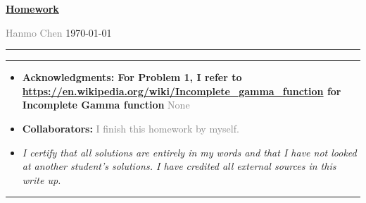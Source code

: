 \documentclass[a4paper]{article}
\begin{document}
\courseheader

\setcounter{hwcnt}{4} %

\begin{center}
  \underline{\bf Homework \thehwcnt} \\
\end{center}
\begin{flushleft}
  \textcolor{gray}{Hanmo Chen}\hfill
  \today
\end{flushleft}
\hrule

\vspace{2em}

\flushleft
\rule{\textwidth}{1pt}
\begin{itemize}
\item {\bf Acknowledgments: \/ For Problem 1, I refer to \url{ https://en.wikipedia.org/wiki/Incomplete_gamma_function} for Incomplete Gamma function} 
  \textcolor{gray}{None}
\item {\bf Collaborators: \/}
  \textcolor{gray}{I finish this homework by myself.} 
\item  \emph{I certify that all solutions are entirely in my words and that I have not looked at another student's solutions. I have credited all external sources in this write up.}
  \framebox[\linewidth]{\rule{0pt}{10pt}\textcolor{gray}{\large Hanmo Chen}}
\end{itemize}
\rule{\textwidth}{1pt}


\vspace{2em}
\end{document}
